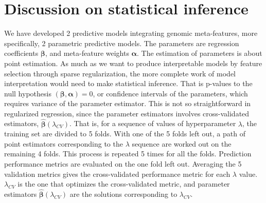 \section*{Discussion on statistical inference}
We have developed 2 predictive models integrating genomic meta-features, more specifically, 2 parametric predictive models. The parameters are regression coefficients $\bm{\beta}$, and meta-feature weights $\bm{\alpha}$. The estimation of parameters is about point estimation. As much as we want to produce interpretable models by feature selection through sparse regularization, the more complete work of model interpretation would need to make statistical inference. That is p-values to the null hypothesis $(\bm{\beta}, \bm{\alpha})=0$, or confidence intervals of the parameters, which requires variance of the parameter estimator. This is not so straightforward in regularized regression, since the parameter estimators involves cross-validated estimators, $\hat{\bm{\beta}}(\lambda_{CV})$. That is, for a sequence of values of hyperparameter $\lambda$, the training set are divided to 5 folds. With one of the 5 folds left out, a path of point estimators corresponding to the $\lambda$ sequence are worked out on the remaining 4 folds. This process is repeated 5 times for all the folds. Prediction performance metrics are evaluated on the one fold left out. Averaging the 5 validation metrics gives the cross-validated performance metric for each $\lambda$ value. $\lambda_{CV}$ is the one that optimizes the cross-validated metric, and parameter estimators $\hat{\bm{\beta}}(\lambda_{CV})$ are the solutions corresponding to $\lambda_{CV}$.

